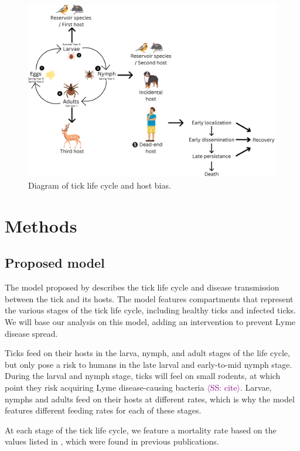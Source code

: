 \documentclass[12pt, centerh1]{article}
\newcommand{\sophie}[1]{{\textcolor{purple}{$\langle$SS: #1$\rangle$}}}
\begin{document}
\begin{figure}[h]
    \centering
    \includegraphics[scale = 0.15]{figures/Tick life cycle and progression of lyme disease.png}
    \caption{Diagram of tick life cycle and host bias.}
    \label{fig:lifecycle}
\end{figure}

\section{Methods}

\subsection{Proposed model}
The model proposed by \citet{lou2014tick} describes the tick life cycle and disease transmission between the tick and its hosts. The model features compartments that represent the various stages of the tick life cycle, including healthy ticks and infected ticks. We will base our analysis on this model, adding an intervention to prevent Lyme disease spread.

Ticks feed on their hosts in the larva, nymph, and adult stages of the life cycle, but only pose a risk to humans in the late larval and early-to-mid nymph stage. During the larval and nymph stage, ticks will feel on small rodents, at which point they risk acquiring Lyme disease-causing bacteria \sophie{cite}. Larvae, nymphs and adults feed on their hosts at different rates, which is why the model features different feeding rates for each of these stages. 

At each stage of the tick life cycle, we feature a mortality rate based on the values listed in \citet{lou2014tick}, which were found in previous publications. 
\end{document}
